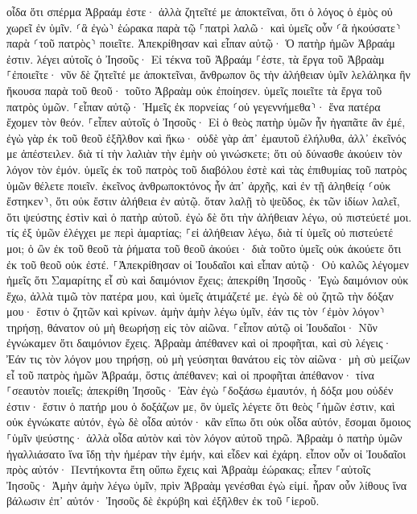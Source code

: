 \documentclass[twoside, 9pt]{extreport}
\begin{document}
οἶδα ὅτι σπέρμα Ἀβραάμ ἐστε· ἀλλὰ ζητεῖτέ με ἀποκτεῖναι, ὅτι ὁ λόγος ὁ ἐμὸς οὐ χωρεῖ ἐν ὑμῖν. 
⸂ἃ ἐγὼ⸃ ἑώρακα παρὰ τῷ ⸀πατρὶ λαλῶ· καὶ ὑμεῖς οὖν ⸂ἃ ἠκούσατε⸃ παρὰ ⸂τοῦ πατρὸς⸃ ποιεῖτε. 
Ἀπεκρίθησαν καὶ εἶπαν αὐτῷ· Ὁ πατὴρ ἡμῶν Ἀβραάμ ἐστιν. λέγει αὐτοῖς ὁ Ἰησοῦς· Εἰ τέκνα τοῦ Ἀβραάμ ⸀ἐστε, τὰ ἔργα τοῦ Ἀβραὰμ ⸀ἐποιεῖτε· 
νῦν δὲ ζητεῖτέ με ἀποκτεῖναι, ἄνθρωπον ὃς τὴν ἀλήθειαν ὑμῖν λελάληκα ἣν ἤκουσα παρὰ τοῦ θεοῦ· τοῦτο Ἀβραὰμ οὐκ ἐποίησεν. 
ὑμεῖς ποιεῖτε τὰ ἔργα τοῦ πατρὸς ὑμῶν. ⸀εἶπαν αὐτῷ· Ἡμεῖς ἐκ πορνείας ⸂οὐ γεγεννήμεθα⸃· ἕνα πατέρα ἔχομεν τὸν θεόν. 
⸀εἶπεν αὐτοῖς ὁ Ἰησοῦς· Εἰ ὁ θεὸς πατὴρ ὑμῶν ἦν ἠγαπᾶτε ἂν ἐμέ, ἐγὼ γὰρ ἐκ τοῦ θεοῦ ἐξῆλθον καὶ ἥκω· οὐδὲ γὰρ ἀπ᾽ ἐμαυτοῦ ἐλήλυθα, ἀλλ᾽ ἐκεῖνός με ἀπέστειλεν. 
διὰ τί τὴν λαλιὰν τὴν ἐμὴν οὐ γινώσκετε; ὅτι οὐ δύνασθε ἀκούειν τὸν λόγον τὸν ἐμόν. 
ὑμεῖς ἐκ τοῦ πατρὸς τοῦ διαβόλου ἐστὲ καὶ τὰς ἐπιθυμίας τοῦ πατρὸς ὑμῶν θέλετε ποιεῖν. ἐκεῖνος ἀνθρωποκτόνος ἦν ἀπ᾽ ἀρχῆς, καὶ ἐν τῇ ἀληθείᾳ ⸂οὐκ ἔστηκεν⸃, ὅτι οὐκ ἔστιν ἀλήθεια ἐν αὐτῷ. ὅταν λαλῇ τὸ ψεῦδος, ἐκ τῶν ἰδίων λαλεῖ, ὅτι ψεύστης ἐστὶν καὶ ὁ πατὴρ αὐτοῦ. 
ἐγὼ δὲ ὅτι τὴν ἀλήθειαν λέγω, οὐ πιστεύετέ μοι. 
τίς ἐξ ὑμῶν ἐλέγχει με περὶ ἁμαρτίας; ⸀εἰ ἀλήθειαν λέγω, διὰ τί ὑμεῖς οὐ πιστεύετέ μοι; 
ὁ ὢν ἐκ τοῦ θεοῦ τὰ ῥήματα τοῦ θεοῦ ἀκούει· διὰ τοῦτο ὑμεῖς οὐκ ἀκούετε ὅτι ἐκ τοῦ θεοῦ οὐκ ἐστέ. 
⸀Ἀπεκρίθησαν οἱ Ἰουδαῖοι καὶ εἶπαν αὐτῷ· Οὐ καλῶς λέγομεν ἡμεῖς ὅτι Σαμαρίτης εἶ σὺ καὶ δαιμόνιον ἔχεις; 
ἀπεκρίθη Ἰησοῦς· Ἐγὼ δαιμόνιον οὐκ ἔχω, ἀλλὰ τιμῶ τὸν πατέρα μου, καὶ ὑμεῖς ἀτιμάζετέ με. 
ἐγὼ δὲ οὐ ζητῶ τὴν δόξαν μου· ἔστιν ὁ ζητῶν καὶ κρίνων. 
ἀμὴν ἀμὴν λέγω ὑμῖν, ἐάν τις τὸν ⸂ἐμὸν λόγον⸃ τηρήσῃ, θάνατον οὐ μὴ θεωρήσῃ εἰς τὸν αἰῶνα. 
⸀εἶπον αὐτῷ οἱ Ἰουδαῖοι· Νῦν ἐγνώκαμεν ὅτι δαιμόνιον ἔχεις. Ἀβραὰμ ἀπέθανεν καὶ οἱ προφῆται, καὶ σὺ λέγεις· Ἐάν τις τὸν λόγον μου τηρήσῃ, οὐ μὴ γεύσηται θανάτου εἰς τὸν αἰῶνα· 
μὴ σὺ μείζων εἶ τοῦ πατρὸς ἡμῶν Ἀβραάμ, ὅστις ἀπέθανεν; καὶ οἱ προφῆται ἀπέθανον· τίνα ⸀σεαυτὸν ποιεῖς; 
ἀπεκρίθη Ἰησοῦς· Ἐὰν ἐγὼ ⸀δοξάσω ἐμαυτόν, ἡ δόξα μου οὐδέν ἐστιν· ἔστιν ὁ πατήρ μου ὁ δοξάζων με, ὃν ὑμεῖς λέγετε ὅτι θεὸς ⸀ἡμῶν ἐστιν, 
καὶ οὐκ ἐγνώκατε αὐτόν, ἐγὼ δὲ οἶδα αὐτόν· κἂν εἴπω ὅτι οὐκ οἶδα αὐτόν, ἔσομαι ὅμοιος ⸀ὑμῖν ψεύστης· ἀλλὰ οἶδα αὐτὸν καὶ τὸν λόγον αὐτοῦ τηρῶ. 
Ἀβραὰμ ὁ πατὴρ ὑμῶν ἠγαλλιάσατο ἵνα ἴδῃ τὴν ἡμέραν τὴν ἐμήν, καὶ εἶδεν καὶ ἐχάρη. 
εἶπον οὖν οἱ Ἰουδαῖοι πρὸς αὐτόν· Πεντήκοντα ἔτη οὔπω ἔχεις καὶ Ἀβραὰμ ἑώρακας; 
εἶπεν ⸀αὐτοῖς Ἰησοῦς· Ἀμὴν ἀμὴν λέγω ὑμῖν, πρὶν Ἀβραὰμ γενέσθαι ἐγὼ εἰμί. 
ἦραν οὖν λίθους ἵνα βάλωσιν ἐπ᾽ αὐτόν· Ἰησοῦς δὲ ἐκρύβη καὶ ἐξῆλθεν ἐκ τοῦ ⸀ἱεροῦ. 
\end{document}
